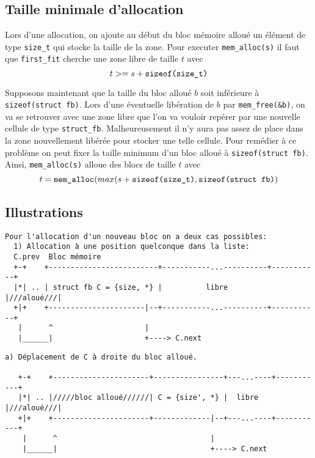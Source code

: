 \documentclass[11pt]{article}
\theoremstyle{definition}
\begin{document}
\subsection{Taille minimale d'allocation}
Lors d'une allocation, on ajoute au début du bloc mémoire alloué un élément de type \texttt{size\_t} qui stocke la taille de la zone.
Pour executer \texttt{mem\_alloc(s)} il faut que \texttt{first\_fit} cherche une zone libre de taille $t$ avec
$$t >= s + \text{\texttt{sizeof(size\_t)}}$$

Supposons maintenant que la taille du bloc alloué $b$ soit inférieure à \texttt{sizeof(struct fb)}.
Lors d'une éventuelle libération de $b$ par \texttt{mem\_free(\&b)}, on va se retrouver
avec une zone libre que l'on va vouloir repérer par une nouvelle cellule de type \texttt{struct\_fb}.
Malheureusement il n'y aura pas assez de place dans la zone nouvellement libérée pour stocker une telle cellule.
Pour remédier à ce problème on peut fixer la taille minimum d'un bloc alloué à \texttt{sizeof(struct fb)}.
Ainsi, \texttt{mem\_alloc(s)} alloue des blocs de taille $t$ avec
$$ t = \text{\texttt{mem\_alloc}}(max(s + \text{\texttt{sizeof(size\_t)}}, \text{\texttt{sizeof(struct fb)}})$$
\subsection{Illustrations}

\begin{lstlisting}[columns=fixed,basicstyle=\scriptsize\ttfamily]
  Pour l'allocation d'un nouveau bloc on a deux cas possibles:
  1) Allocation à une position quelconque dans la liste:
  C.prev  Bloc mémoire
  +-+    +-------------------------+-----------...----------+-----------+
  |*| .. | struct fb C = {size, *} |          libre         |///aloué///|
  +|+    +----------------------|--+-----------...----------+-----------+
   |      ^                     |
   |______|                     +----> C.next
\end{lstlisting}


\begin{lstlisting}[columns=fixed,basicstyle=\scriptsize\ttfamily]
  a) Déplacement de C à droite du bloc alloué.

   +-+    +----------------------+----------------+---...----+-----------+
   |*| .. |/////bloc alloué//////| C = {size', *} |  libre   |///aloué///|
   +|+    +----------------------+-------------|--+---...----+-----------+
    |      ^                                   |
    |______|                                   +----> C.next
\end{lstlisting}
\end{document}
